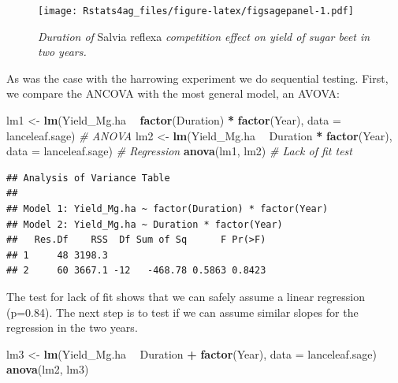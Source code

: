 \documentclass[letterpaper,]{book}
\newenvironment{Shaded}{\begin{snugshade}}{\end{snugshade}}
\newcommand{\CommentTok}[1]{\textcolor[rgb]{0.56,0.35,0.01}{\textit{#1}}}
\newcommand{\DataTypeTok}[1]{\textcolor[rgb]{0.13,0.29,0.53}{#1}}
\newcommand{\KeywordTok}[1]{\textcolor[rgb]{0.13,0.29,0.53}{\textbf{#1}}}
\newcommand{\NormalTok}[1]{#1}
\newcommand{\OperatorTok}[1]{\textcolor[rgb]{0.81,0.36,0.00}{\textbf{#1}}}
\newcommand{\StringTok}[1]{\textcolor[rgb]{0.31,0.60,0.02}{#1}}
\begin{document}
\begin{figure}
\centering
\texttt{[image: Rstats4ag\_files/figure-latex/figsagepanel-1.pdf]}
\caption{\label{fig:figsagepanel}\emph{Duration of} Salvia reflexa \emph{competition effect on yield of sugar beet in two years.}}
\end{figure}

As was the case with the harrowing experiment we do sequential testing. First, we compare the ANCOVA with the most general model, an AVOVA:

\begin{Shaded}
\begin{Highlighting}[]
\NormalTok{lm1 <-}\StringTok{ }\KeywordTok{lm}\NormalTok{(Yield_Mg.ha }\OperatorTok{~}\StringTok{ }\KeywordTok{factor}\NormalTok{(Duration) }\OperatorTok{*}\StringTok{ }\KeywordTok{factor}\NormalTok{(Year), }\DataTypeTok{data =}\NormalTok{ lanceleaf.sage) }\CommentTok{# ANOVA}
\NormalTok{lm2 <-}\StringTok{ }\KeywordTok{lm}\NormalTok{(Yield_Mg.ha }\OperatorTok{~}\StringTok{ }\NormalTok{Duration }\OperatorTok{*}\StringTok{ }\KeywordTok{factor}\NormalTok{(Year), }\DataTypeTok{data =}\NormalTok{ lanceleaf.sage) }\CommentTok{# Regression}
\KeywordTok{anova}\NormalTok{(lm1, lm2) }\CommentTok{# Lack of fit test}
\end{Highlighting}
\end{Shaded}

\begin{verbatim}
## Analysis of Variance Table
## 
## Model 1: Yield_Mg.ha ~ factor(Duration) * factor(Year)
## Model 2: Yield_Mg.ha ~ Duration * factor(Year)
##   Res.Df    RSS  Df Sum of Sq      F Pr(>F)
## 1     48 3198.3                            
## 2     60 3667.1 -12   -468.78 0.5863 0.8423
\end{verbatim}

The test for lack of fit shows that we can safely assume a linear regression (p=0.84). The next step is to test if we can assume similar slopes for the regression in the two years.

\begin{Shaded}
\begin{Highlighting}[]
\NormalTok{lm3 <-}\StringTok{ }\KeywordTok{lm}\NormalTok{(Yield_Mg.ha }\OperatorTok{~}\StringTok{ }\NormalTok{Duration }\OperatorTok{+}\StringTok{ }\KeywordTok{factor}\NormalTok{(Year), }\DataTypeTok{data =}\NormalTok{ lanceleaf.sage)}
\KeywordTok{anova}\NormalTok{(lm2, lm3) }
\end{Highlighting}
\end{Shaded}
\end{document}
